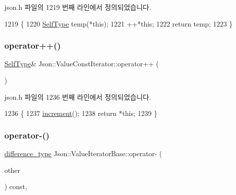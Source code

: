 json.\+h 파일의 1219 번째 라인에서 정의되었습니다.


\begin{DoxyCode}
1219                            \{
1220     \hyperlink{class_json_1_1_value_const_iterator_a0c2e33e7eb5a80dd8709fb28ece83933}{SelfType} temp(*\textcolor{keyword}{this});
1221     ++*\textcolor{keyword}{this};
1222     \textcolor{keywordflow}{return} temp;
1223   \}
\end{DoxyCode}
\mbox{\label{class_json_1_1_value_const_iterator_a2cfe2f7a94a688186efdafb1b181c319}} 
\subsubsection{\texorpdfstring{operator++()}{operator++()}\hspace{0.1cm}{\footnotesize\ttfamily [2/2]}}
{\footnotesize\ttfamily \hyperlink{class_json_1_1_value_iterator_base_a9d2a940d03ea06d20d972f41a89149ee}{Self\+Type}\& Json\+::\+Value\+Const\+Iterator\+::operator++ (\begin{DoxyParamCaption}{ }\end{DoxyParamCaption})\hspace{0.3cm}{\ttfamily [inline]}}



json.\+h 파일의 1236 번째 라인에서 정의되었습니다.


\begin{DoxyCode}
1236                          \{
1237     \hyperlink{class_json_1_1_value_iterator_base_afe58f9534e1fd2033419fd9fe244551e}{increment}();
1238     \textcolor{keywordflow}{return} *\textcolor{keyword}{this};
1239   \}
\end{DoxyCode}
\mbox{\label{class_json_1_1_value_iterator_base_a98e254263fca5f1fc8fcac7bcb0260bf}} 
\subsubsection{\texorpdfstring{operator-\/()}{operator-()}}
{\footnotesize\ttfamily \hyperlink{class_json_1_1_value_iterator_base_a4e44bf8cbd17ec8d6e2c185904a15ebd}{difference\+\_\+type} Json\+::\+Value\+Iterator\+Base\+::operator-\/ (\begin{DoxyParamCaption}\item[{const \hyperlink{class_json_1_1_value_iterator_base_a9d2a940d03ea06d20d972f41a89149ee}{Self\+Type} \&}]{other }\end{DoxyParamCaption}) const\hspace{0.3cm}{\ttfamily [inline]}, {\ttfamily [inherited]}}



